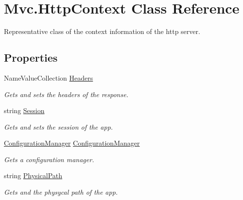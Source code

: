 \hypertarget{class_mvc_1_1_http_context}{}\section{Mvc.\+Http\+Context Class Reference}
\label{class_mvc_1_1_http_context}


Representative class of the context information of the http server.  


\subsection*{Properties}
\begin{DoxyCompactItemize}
\item 
Name\+Value\+Collection \hyperlink{class_mvc_1_1_http_context_a353d7d8e5410d7483df18887824d9e03}{Headers}
\begin{DoxyCompactList}\small\item\em Gets and sets the headers of the response. \end{DoxyCompactList}\item 
string \hyperlink{class_mvc_1_1_http_context_a467051f9750430b364e63069a2327b70}{Session}
\begin{DoxyCompactList}\small\item\em Gets and sets the session of the app. \end{DoxyCompactList}\item 
\hyperlink{class_mvc_1_1_configuration_manager}{Configuration\+Manager} \hyperlink{class_mvc_1_1_http_context_aa5b6a4fb30772a7739a61b2788b21921}{Configuration\+Manager}
\begin{DoxyCompactList}\small\item\em Gets a configuration manager. \end{DoxyCompactList}\item 
string \hyperlink{class_mvc_1_1_http_context_afbc78dfac5e1f0097c1a2cf8b9ed63ca}{Physical\+Path}
\begin{DoxyCompactList}\small\item\em Gets and the physycal path of the app. \end{DoxyCompactList}\end{DoxyCompactItemize}


